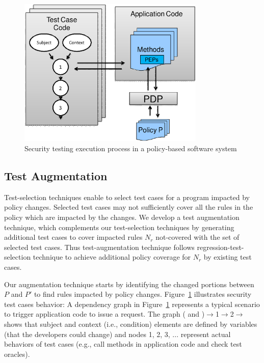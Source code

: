 \begin{figure}[t]
  \centering
     \includegraphics[width=3.5in]{testaugument.eps}
    \vspace{-4pt}
 \caption{\label{fig:testexecution}Security testing execution process in a policy-based software system}
  \vspace{-10pt}
 \vspace{+3pt}
\end{figure}

\subsection{Test Augmentation}
\label{subsec:testaugmentation}
Test-selection techniques enable to select test cases for a program impacted by policy changes. Selected test cases may 
not sufficiently cover all the rules in the policy which are impacted by the changes. 
We develop a test augmentation technique, which complements our test-selection techniques by generating additional test cases to 
cover impacted rules $N_r$ not-covered with the set of selected test cases. Thus test-augmentation technique follows regression-test-selection technique to achieve
additional policy coverage for $N_r$ by existing test cases.

Our augmentation technique starts by identifying the changed portions between $P$ and $P'$ to find rules impacted by policy changes.
Figure~\ref{fig:testexecution} illustrates security test cases behavior: 
A dependency graph in Figure~\ref{fig:testexecution} represents a typical scenario to trigger application code to issue a request.
The graph ( and )$\rightarrow$1$\rightarrow$2$\rightarrow$ shows that subject and context (i.e., condition) elements are defined by variables (that
the developers could change) and nodes 1, 2, 3, ... represent actual behaviors of test cases (e.g., call methods in application
code and check test oracles).

